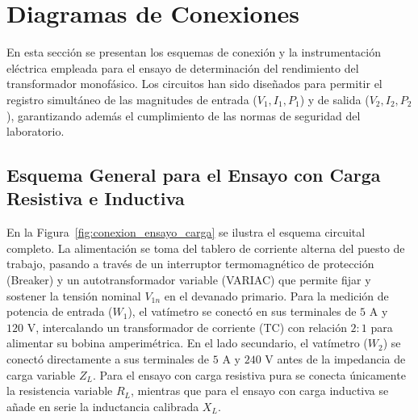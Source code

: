 \section{Diagramas de Conexiones}

En esta sección se presentan los esquemas de conexión y la instrumentación eléctrica empleada para el ensayo de determinación del rendimiento del transformador monofásico. Los circuitos han sido diseñados para permitir el registro simultáneo de las magnitudes de entrada ($V_1, I_1, P_1$) y de salida ($V_2, I_2, P_2$), garantizando además el cumplimiento de las normas de seguridad del laboratorio.

\subsection{Esquema General para el Ensayo con Carga Resistiva e Inductiva}

En la Figura~\ref{fig:conexion_ensayo_carga} se ilustra el esquema circuital completo. La alimentación se toma del tablero de corriente alterna del puesto de trabajo, pasando a través de un interruptor termomagnético de protección (Breaker) y un autotransformador variable (VARIAC) que permite fijar y sostener la tensión nominal $V_{1n}$ en el devanado primario. Para la medición de potencia de entrada ($W_1$), el vatímetro se conectó en sus terminales de $5\text{ A}$ y $120\text{ V}$, intercalando un transformador de corriente (TC) con relación $2:1$ para alimentar su bobina amperimétrica. En el lado secundario, el vatímetro ($W_2$) se conectó directamente a sus terminales de $5\text{ A}$ y $240\text{ V}$ antes de la impedancia de carga variable $Z_L$. Para el ensayo con carga resistiva pura se conecta únicamente la resistencia variable $R_L$, mientras que para el ensayo con carga inductiva se añade en serie la inductancia calibrada $X_L$.

